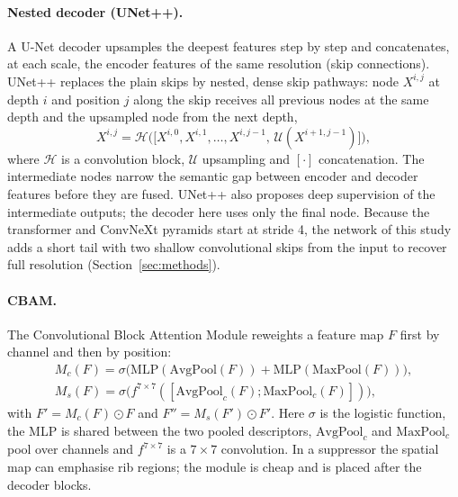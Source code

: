 \paragraph{Nested decoder (UNet++).} A U-Net decoder upsamples the deepest features step by step and concatenates, at each scale, the encoder
features of the same resolution (skip connections). UNet++ \citep{zhou2018unetpp} replaces the plain skips by nested, dense skip pathways: node
$X^{i,j}$ at depth $i$ and position $j$ along the skip receives all previous nodes at the same depth and the upsampled node from the next depth,
\begin{equation}
X^{i,j}=\mathcal{H}\Big(\big[X^{i,0},X^{i,1},\dots,X^{i,j-1},\,\mathcal{U}(X^{i+1,j-1})\big]\Big),
\label{eq:bg_unetpp}
\end{equation}
where $\mathcal{H}$ is a convolution block, $\mathcal{U}$ upsampling and $[\cdot]$ concatenation. The intermediate nodes narrow the semantic gap
between encoder and decoder features before they are fused. UNet++ also proposes deep supervision of the intermediate outputs; the decoder here
uses only the final node. Because the transformer and ConvNeXt pyramids start at stride 4, the network of this study adds a short tail with two
shallow convolutional skips from the input to recover full resolution (Section~\ref{sec:methods}).

\paragraph{CBAM.} The Convolutional Block Attention Module \citep{woo2018cbam} reweights a feature map $F$ first by channel and then by
position:
\begin{equation}
\begin{gathered}
M_c(F)=\sigma\big(\mathrm{MLP}(\mathrm{AvgPool}(F))+\mathrm{MLP}(\mathrm{MaxPool}(F))\big),\\
M_s(F)=\sigma\big(f^{7\times7}([\mathrm{AvgPool}_c(F);\mathrm{MaxPool}_c(F)])\big),
\end{gathered}
\label{eq:bg_cbam}
\end{equation}
with $F'=M_c(F)\odot F$ and $F''=M_s(F')\odot F'$. Here $\sigma$ is the logistic function, the MLP is shared between the two pooled descriptors,
$\mathrm{AvgPool}_c$ and $\mathrm{MaxPool}_c$ pool over channels and $f^{7\times7}$ is a $7\times7$ convolution. In a suppressor the spatial map
can emphasise rib regions; the module is cheap and is placed after the decoder blocks.

